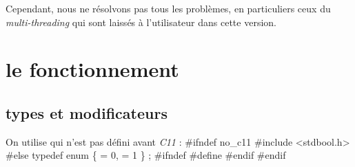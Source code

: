 \documentclass{scrartcl}%
\begin{document}
Cependant, nous ne résolvons pas tous les problèmes, en particuliers ceux du \emph{multi-threading} qui sont laissés à l'utilisateur dans cette version.


\section{le fonctionnement}
\subsection{types et modificateurs}
On utilise {\Tt{}\nwendquote} qui n'est pas défini avant \emph{C11} :
\nwenddocs{}\endmoddef\nwstartdeflinemarkup{}\nwenddeflinemarkup
#ifndef no_c11
  #include <stdbool.h>
#else
typedef enum \{
   = 0,
   = 1
\} ;
#ifndef 
  #define 
#endif
#endif
\end{document}
